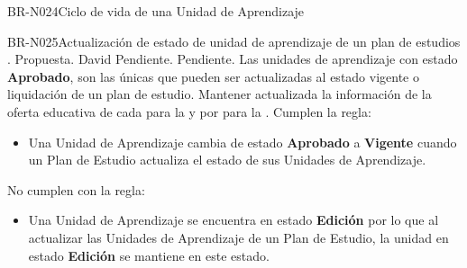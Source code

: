 \begin{BusinessRule}{BR-N024}{Ciclo de vida de una  Unidad de Aprendizaje}
	
	
	
	\end{BusinessRule}
	 
	
	 \begin{BusinessRule}{BR-N025}{Actualización de estado de unidad de aprendizaje de un plan de estudios}
	 	{\bcCondition}    %
	 	{\btEnabler}     %
	 	{\blControlling}    %
	 	.
	 	\BRItem[Estado] Propuesta.
	 	 David
	 	 Pendiente.
	 	 Pendiente.
	 	\BRItem[Descripción] Las unidades de aprendizaje con estado \textbf{Aprobado}, son las únicas que pueden ser actualizadas al estado vigente o liquidación de un plan de estudio.
	 	\BRItem[Motivación] Mantener actualizada la información de la oferta educativa de cada  para la  y por  para la .
	 	 Cumplen la regla:
	 	\begin{itemize}
	 		\item Una Unidad de Aprendizaje cambia de estado \textbf{Aprobado} a \textbf{Vigente} cuando un Plan de Estudio actualiza el estado de sus Unidades de Aprendizaje.
	 	\end{itemize}
	 	 No cumplen con la regla:
	 	\begin{itemize}
	 		\item Una Unidad de Aprendizaje se encuentra en estado \textbf{Edición} por lo que al actualizar las Unidades de Aprendizaje de un Plan de Estudio, la unidad en estado \textbf{Edición} se mantiene en este estado.
	 	\end{itemize}
\end{BusinessRule}

